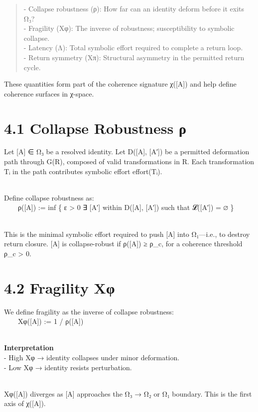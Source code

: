 \begin{quote}
- Collapse robustness (ρ): How far can an identity deform before it
exits Ω₃?\\
- Fragility (Xφ): The inverse of robustness; susceptibility to symbolic
collapse.\\
- Latency (Λ): Total symbolic effort required to complete a return
loop.\\
- Return symmetry (Xπ): Structural asymmetry in the permitted return
cycle.
\end{quote}

These quantities form part of the coherence signature χ({[}A{]}) and
help define coherence surfaces in χ-space.

\section{4.1 \textbar{} Collapse Robustness
ρ}\label{collapse-robustness-ux3c1}

Let {[}A{]} ∈ Ω₃ be a resolved identity. Let D({[}A{]}, {[}A′{]}) be a
permitted deformation path through G(R), composed of valid
transformations in R. Each transformation Tᵢ in the path contributes
symbolic effort effort(Tᵢ).\\
\strut \\
Define collapse robustness as:\\
  ρ({[}A{]}) := inf \{ ε \textgreater{} 0 \textbar{} ∃ {[}A′{]} within
D({[}A{]}, {[}A′{]}) such that 𝓛({[}A′{]}) = ∅ \}\\
\strut \\
This is the minimal symbolic effort required to push {[}A{]} into
Ω₁---i.e., to destroy return closure. {[}A{]} is collapse-robust if
ρ({[}A{]}) ≥ ρ\_c, for a coherence threshold ρ\_c \textgreater{} 0.

\section{4.2 \textbar{} Fragility Xφ}\label{fragility-xux3c6}

We define fragility as the inverse of collapse robustness:\\
  Xφ({[}A{]}) := 1 / ρ({[}A{]})\\
\strut \\
\textbf{Interpretation}\\
- High Xφ → identity collapses under minor deformation.\\
- Low Xφ → identity resists perturbation.\\
\strut \\
Xφ({[}A{]}) diverges as {[}A{]} approaches the Ω₃ → Ω₂ or Ω₁ boundary.
This is the first axis of χ({[}A{]}).

